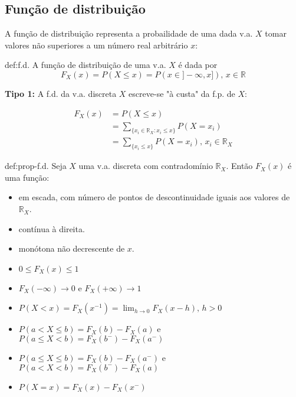 \subsection[2.1 Função de distribuição]{\hspace*{0.075 em}\raisebox{0.2 em}{$\pmb{\drsh}$} Função  de distribuição}

A função de distribuição representa a probailidade de uma dada v.a. $X$ tomar valores não superiores a um número real arbitrário $x$:

\begin{theo}{def:f.d.}\label{def:f.d.}
    A função de distribuição de uma v.a. $X$ é dada por
    $$ 
    F_X(x) = P(X \leq x) = P\left(x \in ]-\infty, x]\right),\, x \in \mathbb{R}
    $$  
\end{theo}

\noindent\textbf{Tipo 1:} A f.d. da v.a. discreta $X$ escreve-se "à custa" da f.p. de $X$:

\begin{align*}
    F_X(x) &= P(X \leq x)\\
           &= \sum_{\{x_i \in \mathbb{R}_X: x_i \leq x\}} P(X = x_i)\\
           &= \sum_{\{x_i \leq x\}} P(X = x_i),\, x_i \in \mathbb{R}_X
\end{align*}

\begin{theo}{def:prop-f.d.}\label{def:prop-f.d.}
Seja $X$ uma v.a. discreta com contradomínio $\mathbb{R}_X$. Então $F_X(x)$ é uma função:

\vspace{-0.5em}
\begin{itemize}
    \item em escada, com número de pontos de descontinuidade iguais aos valores  de $\mathbb{R}_X$.
    \item contínua à direita.
    \item monótona não decrescente de $x$.
    \item $0 \leq F_X(x) \leq 1$
    \item $F_X(-\infty) \to 0$ e $F_X(+\infty) \to 1$
    \item $P(X < x) = F_X(x^{-1}) = \lim_{h \to 0} F_X(x - h),\, h > 0$
    \item $P(a < X \leq b) = F_X(b) - F_X(a)$ e $P(a \leq X < b) = F_X(b^-) - F_X(a^-)$
    \item $P(a \leq X \leq b) = F_X(b) - F_X(a^-)$ e $P(a < X < b) = F_X(b^-) - F_X(a)$
    \item $P(X = x) = F_X(x) - F_X(x^-)$
\end{itemize}
\end{theo}

